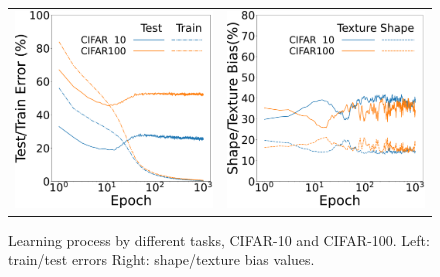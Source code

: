 \begin{figure}[htb]
\centering
    \begin{tabular}{cc}
      \includegraphics[keepaspectratio, width=0.45\linewidth]{fig/IN_dataset_learning_curv.pdf} &
      \hspace{5pt}
      \includegraphics[keepaspectratio, width=0.45\linewidth]{fig/IN_dataset_sha_tex.pdf}
    \end{tabular}
\caption[Learning process by different tasks, CIFAR-10 and CIFAR-100.]{Learning process by different tasks, CIFAR-10 and CIFAR-100. Left: train/test errors Right: shape/texture bias values.
}
\label{fig:comp_IN_dataset}
\end{figure}

